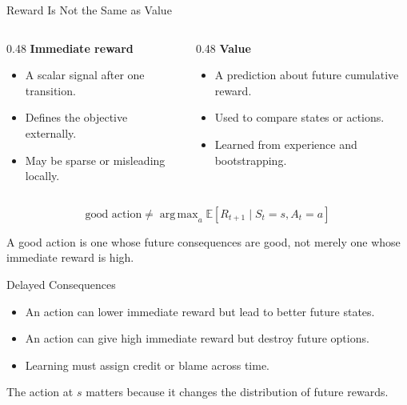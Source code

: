 \documentclass[aspectratio=169]{beamer}
\newcommand{\EE}{\mathbb{E}}
\DeclareMathOperator*{\argmax}{arg\,max}
\begin{document}
\begin{frame}{Reward Is Not the Same as Value}
\small
\begin{columns}[T,onlytextwidth]
\begin{column}{0.48\textwidth}
\textbf{Immediate reward}
\begin{itemize}
    \item A scalar signal after one transition.
    \item Defines the objective externally.
    \item May be sparse or misleading locally.
\end{itemize}
\end{column}
\begin{column}{0.48\textwidth}
\textbf{Value}
\begin{itemize}
    \item A prediction about future cumulative reward.
    \item Used to compare states or actions.
    \item Learned from experience and bootstrapping.
\end{itemize}
\end{column}
\end{columns}

\vspace{0.8em}
\[
\text{good action} \neq \argmax_a \EE[R_{t+1}\mid S_t=s,A_t=a]
\]

\vspace{0.4em}
A good action is one whose future consequences are good, not merely one whose immediate reward is high.
\end{frame}

\begin{frame}{Delayed Consequences}
\small
\begin{itemize}
    \item An action can lower immediate reward but lead to better future states.
    \item An action can give high immediate reward but destroy future options.
    \item Learning must assign credit or blame across time.
\end{itemize}

\vspace{0.8em}
\begin{center}
\end{center}

\vspace{0.5em}
The action at $s$ matters because it changes the distribution of future rewards.
\end{frame}
\end{document}
